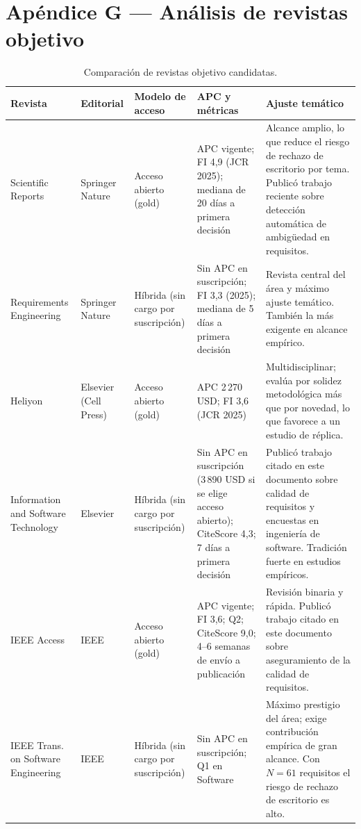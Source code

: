 \documentclass[journal,onecolumn]{IEEEtran}
\begin{document}
	\section*{Apéndice G --- Análisis de revistas objetivo}
	\label{ap:revistas}
	
	\begin{table}[H]
		\centering
		\caption{Comparación de revistas objetivo candidatas.}
		\label{tab:revistas}
		\small
		\begin{tabularx}{\textwidth}{@{}p{3.0cm} p{1.7cm} p{1.5cm} p{2.4cm} X@{}}
			\toprule
			\textbf{Revista} & \textbf{Editorial} & \textbf{Modelo de acceso} & \textbf{APC y métricas} & \textbf{Ajuste temático} \\
			\midrule
			Scientific Reports & Springer Nature & Acceso abierto (gold) & APC vigente; FI 4,9 (JCR 2025); mediana de 20 días a primera decisión & Alcance amplio, lo que reduce el riesgo de rechazo de escritorio por tema. Publicó trabajo reciente sobre detección automática de ambigüedad en requisitos. \\
			\addlinespace
			Requirements Engineering & Springer Nature & Híbrida (sin cargo por suscripción) & Sin APC en suscripción; FI 3,3 (2025); mediana de 5 días a primera decisión & Revista central del área y máximo ajuste temático. También la más exigente en alcance empírico. \\
			\addlinespace
			Heliyon & Elsevier (Cell Press) & Acceso abierto (gold) & APC 2\,270 USD; FI 3,6 (JCR 2025) & Multidisciplinar; evalúa por solidez metodológica más que por novedad, lo que favorece a un estudio de réplica. \\
			\addlinespace
			Information and Software Technology & Elsevier & Híbrida (sin cargo por suscripción) & Sin APC en suscripción (3\,890 USD si se elige acceso abierto); CiteScore 4,3; 7 días a primera decisión & Publicó trabajo citado en este documento sobre calidad de requisitos y encuestas en ingeniería de software. Tradición fuerte en estudios empíricos. \\
			\addlinespace
			IEEE Access & IEEE & Acceso abierto (gold) & APC vigente; FI 3,6; Q2; CiteScore 9,0; 4--6 semanas de envío a publicación & Revisión binaria y rápida. Publicó trabajo citado en este documento sobre aseguramiento de la calidad de requisitos. \\
			\addlinespace
			IEEE Trans. on Software Engineering & IEEE & Híbrida (sin cargo por suscripción) & Sin APC en suscripción; Q1 en Software & Máximo prestigio del área; exige contribución empírica de gran alcance. Con $N = 61$ requisitos el riesgo de rechazo de escritorio es alto. \\
			\bottomrule
		\end{tabularx}
	\end{table}
	
\end{document}
